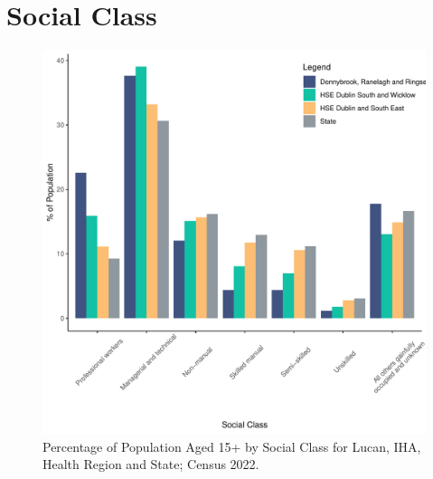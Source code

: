\documentclass{article}
\begin{document}
\section{Social Class}\label{sect:SC}
\begin{figure}[H]
	\centering
	\includegraphics[width = 140mm]{../figures/SocialClassED.pdf}
	\caption{Percentage of Population Aged 15+ by Social Class for Lucan, IHA, Health Region and State; Census 2022.}
	\label{fig:vbnv}
	\end{figure}
\end{document}
